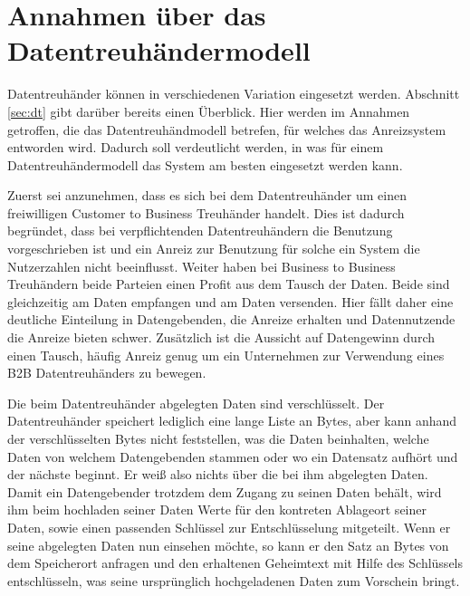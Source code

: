 \documentclass[11pt,a4paper]{scrreprt}
\begin{document}
\section{Annahmen über das Datentreuhändermodell}
Datentreuhänder können in verschiedenen Variation eingesetzt werden. Abschnitt \ref{sec:dt} gibt darüber bereits einen Überblick. Hier werden im Annahmen getroffen, die das Datentreuhändmodell betrefen, für welches das Anreizsystem entworden wird. Dadurch soll verdeutlicht werden, in was für einem Datentreuhändermodell das System am besten eingesetzt werden kann.

Zuerst sei anzunehmen, dass es sich bei dem Datentreuhänder um einen freiwilligen Customer to Business Treuhänder handelt. Dies ist dadurch begründet, dass bei verpflichtenden Datentreuhändern die Benutzung vorgeschrieben ist und ein Anreiz zur Benutzung für solche ein System die Nutzerzahlen nicht beeinflusst. Weiter haben bei Business to Business Treuhändern beide Parteien einen Profit aus dem Tausch der Daten. Beide sind gleichzeitig am Daten empfangen und am Daten versenden. Hier fällt daher eine deutliche Einteilung in Datengebenden, die Anreize erhalten und Datennutzende die Anreize bieten schwer. Zusätzlich ist die Aussicht auf Datengewinn durch einen Tausch, häufig Anreiz genug um ein Unternehmen zur Verwendung eines B2B Datentreuhänders zu bewegen. 

Die beim Datentreuhänder abgelegten Daten sind verschlüsselt. Der Datentreuhänder speichert lediglich eine lange Liste an Bytes, aber kann anhand der verschlüsselten Bytes nicht feststellen, was die Daten beinhalten, welche Daten von welchem Datengebenden stammen oder wo ein Datensatz aufhört und der nächste beginnt. Er weiß also nichts über die bei ihm abgelegten Daten. Damit ein Datengebender trotzdem dem Zugang zu seinen Daten behält, wird ihm beim hochladen seiner Daten Werte für den kontreten Ablageort seiner Daten, sowie einen passenden Schlüssel zur Entschlüsselung mitgeteilt. Wenn er seine abgelegten Daten nun einsehen möchte, so kann er den Satz an Bytes von dem Speicherort anfragen und den erhaltenen Geheimtext mit Hilfe des Schlüssels entschlüsseln, was seine ursprünglich hochgeladenen Daten zum Vorschein bringt.
\end{document}
